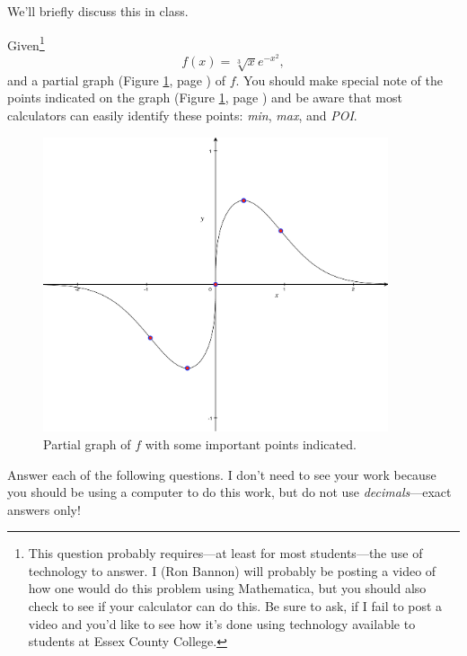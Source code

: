\documentclass[12pt,addpoints, answers, fleqn]{exam}
\begin{document}
\begin{questions}
\begin{solution}
We'll briefly discuss this in class.
\end{solution}


\question Given\footnote{This question probably requires---at least for most students---the use of technology to answer. I (Ron Bannon) will probably be posting a video of how one would do this problem using Mathematica, but you should also check to see if your calculator can do this. Be sure to ask, if I fail to post a video and you'd like to see how it's done using technology available to students at Essex County College.}
\[
f \left( x \right) = \sqrt[3]{x} e^{-x^2},
\]
and a partial graph (Figure \ref{fig:2305}, page \pageref{fig:2305}) of $f$. You should make special note of the points indicated on the graph (Figure \ref{fig:2305}, page \pageref{fig:2305}) and be aware that most calculators can easily identify these points: \emph{min}, \emph{max}, and \emph{POI}.
\begin{figure}[htbp] %
   \centering
   \includegraphics[width=4in]{./graphics/graph2305.pdf} 
   \caption{Partial graph of $f$ with some important points indicated.}
   \label{fig:2305}
\end{figure}



Answer each of the following questions. I don't need to see your work because you should be using a computer to do this work, but do not use \emph{decimals}---exact answers only!
\end{questions}
\end{document}
